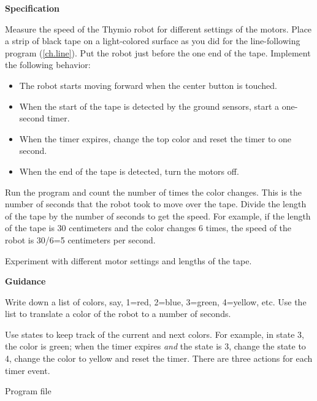 \label{ch.speed}

\textbf{Specification}

Measure the speed of the Thymio robot for different settings of the
motors. Place a strip of black tape on a light-colored surface as you
did for the line-following program (\cref{ch.line}). Put the robot just
before the one end of the tape. Implement the following behavior:

\begin{itemize}

\item The robot starts moving forward when the center button is touched.

\item When the start of the tape is detected by the ground sensors,
start a one-second timer.

\item When the timer expires, change the top color and reset the timer
to one second.

\item When the end of the tape is detected, turn the motors off.

\end{itemize} 

Run the program and count the number of times the color changes. This is
the number of seconds that the robot took to move over the tape. Divide
the length of the tape by the number of seconds to get the speed. For
example, if the length of the tape is 30 centimeters and the color
changes 6 times, the speed of the robot is 30/6=5 centimeters per
second.

Experiment with different motor settings and lengths of the tape.

\textbf{Guidance}

Write down a list of colors, say, 1=red, 2=blue, 3=green, 4=yellow, etc.
Use the list to translate a color of the robot to a number of seconds.

Use states to keep track of the current and next colors. For example, in
state 3, the color is green; when the timer expires \emph{and} the state
is 3, change the state to 4, change the color to yellow and reset the
timer. There are three actions for each timer event.

\bigskip

{\raggedleft \hfill Program file }
